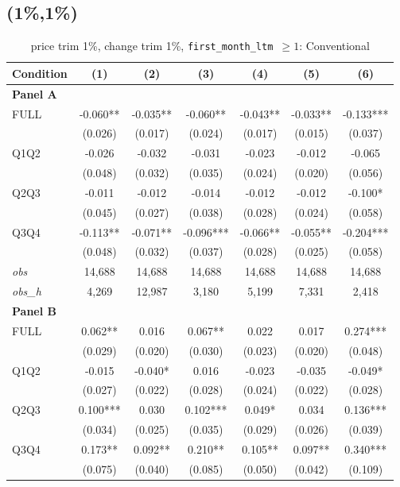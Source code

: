 \subsection{(1\%,1\%)}
\begin{table}[!htbp]
\centering
\caption{price trim 1\%, change trim 1\%, \texttt{first\_month\_ltm $\geq 1$}: Conventional}
\label{tab:abc:trim11:ltm1:conventional:bal}
\small
\begin{tabular}{lcccccc}
\toprule
Condition & (1) & (2) & (3) & (4) & (5) & (6) \\
\midrule
\textbf{Panel A} &&&&&&  \\

FULL & -0.060** & -0.035** & -0.060** & -0.043** & -0.033** & -0.133*** \\
 & (0.026) & (0.017) & (0.024) & (0.017) & (0.015) & (0.037) \\
Q1Q2 & -0.026 & -0.032 & -0.031 & -0.023 & -0.012 & -0.065 \\
 & (0.048) & (0.032) & (0.035) & (0.024) & (0.020) & (0.056) \\
Q2Q3 & -0.011 & -0.012 & -0.014 & -0.012 & -0.012 & -0.100* \\
 & (0.045) & (0.027) & (0.038) & (0.028) & (0.024) & (0.058) \\
Q3Q4 & -0.113** & -0.071** & -0.096*** & -0.066** & -0.055** & -0.204*** \\
 & (0.048) & (0.032) & (0.037) & (0.028) & (0.025) & (0.058) \\

\textit{obs} & 14,688 & 14,688 & 14,688 & 14,688 & 14,688 & 14,688 \\
\textit{obs\_h} &  4,269 & 12,987 &  3,180 &  5,199 &  7,331 &  2,418 \\

\textbf{Panel B} &&&&&&  \\

FULL & 0.062** & 0.016 & 0.067** & 0.022 & 0.017 & 0.274*** \\
 & (0.029) & (0.020) & (0.030) & (0.023) & (0.020) & (0.048) \\
Q1Q2 & -0.015 & -0.040* & 0.016 & -0.023 & -0.035 & -0.049* \\
 & (0.027) & (0.022) & (0.028) & (0.024) & (0.022) & (0.028) \\
Q2Q3 & 0.100*** & 0.030 & 0.102*** & 0.049* & 0.034 & 0.136*** \\
 & (0.034) & (0.025) & (0.035) & (0.029) & (0.026) & (0.039) \\
Q3Q4 & 0.173** & 0.092** & 0.210** & 0.105** & 0.097** & 0.340*** \\
 & (0.075) & (0.040) & (0.085) & (0.050) & (0.042) & (0.109) \\


\end{tabular}
\end{table}
